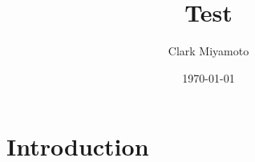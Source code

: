 \documentclass{article}
\title{Test}
\author{Clark Miyamoto}
\date{\today}
\begin{document}
\maketitle

\section{Introduction}
\end{document}
